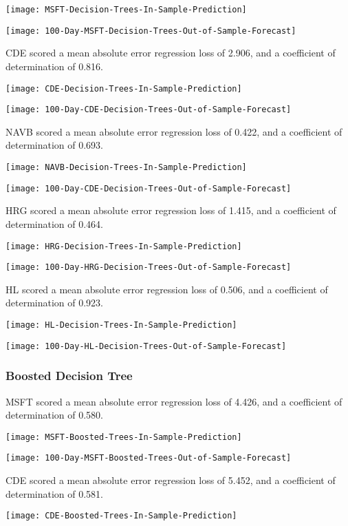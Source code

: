 \texttt{[image: MSFT-Decision-Trees-In-Sample-Prediction]}

\texttt{[image: 100-Day-MSFT-Decision-Trees-Out-of-Sample-Forecast]}

CDE scored a mean absolute error regression loss of 2.906, and a coefficient of determination of 0.816.

\texttt{[image: CDE-Decision-Trees-In-Sample-Prediction]}

\texttt{[image: 100-Day-CDE-Decision-Trees-Out-of-Sample-Forecast]}

NAVB scored a mean absolute error regression loss of 0.422, and a coefficient of determination of 0.693.

\texttt{[image: NAVB-Decision-Trees-In-Sample-Prediction]}

\texttt{[image: 100-Day-CDE-Decision-Trees-Out-of-Sample-Forecast]}

HRG scored a mean absolute error regression loss of 1.415, and a coefficient of determination of 0.464.

\texttt{[image: HRG-Decision-Trees-In-Sample-Prediction]}

\texttt{[image: 100-Day-HRG-Decision-Trees-Out-of-Sample-Forecast]}

HL scored a mean absolute error regression loss of 0.506, and a coefficient of determination of 0.923.

\texttt{[image: HL-Decision-Trees-In-Sample-Prediction]}

\texttt{[image: 100-Day-HL-Decision-Trees-Out-of-Sample-Forecast]}

\subsubsection{Boosted Decision Tree}
MSFT scored a mean absolute error regression loss of 4.426, and a coefficient of determination of 0.580.

\texttt{[image: MSFT-Boosted-Trees-In-Sample-Prediction]}

\texttt{[image: 100-Day-MSFT-Boosted-Trees-Out-of-Sample-Forecast]}

CDE scored a mean absolute error regression loss of 5.452, and a coefficient of determination of 0.581.

\texttt{[image: CDE-Boosted-Trees-In-Sample-Prediction]}

